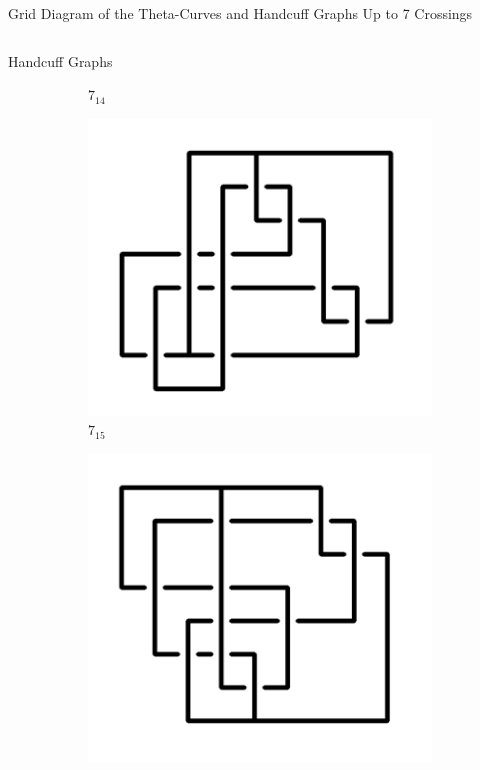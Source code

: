 \documentclass[final]{beamer}
\begin{document}
\begin{frame}[t]
\begin{alertblock}{Grid Diagram of the Theta-Curves and Handcuff Graphs Up to 7 Crossings}
\begin{columns}[t]
\begin{column}{0.5\textwidth}
\begin{alertblock}{Handcuff Graphs}
\begin{figure}
\begin{subfigure}{0.075\textwidth}
    \caption{$7_{14}$} 
    \end{subfigure}
    \begin{subfigure}{0.075\textwidth}
    \includegraphics[width=\columnwidth]{../Midterm_Poster/grid_diagram/handcuff_7_15.png}
    \caption{$7_{15}$} 
    \end{subfigure}
    \begin{subfigure}{0.075\textwidth}
    \includegraphics[width=\columnwidth]{../Midterm_Poster/grid_diagram/handcuff_7_16.png}

\end{subfigure}
\end{figure}
\end{alertblock}
\end{column}
\end{columns}
\end{alertblock}
\end{frame}
\end{document}
